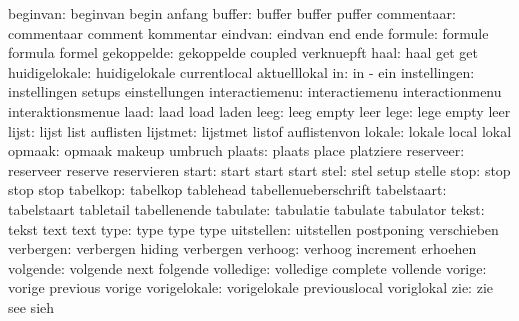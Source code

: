            beginvan:  beginvan             begin               anfang
             buffer:  buffer               buffer              puffer
         commentaar:  commentaar           comment             kommentar
            eindvan:  eindvan              end                 ende
            formule:  formule              formula             formel
         gekoppelde:  gekoppelde           coupled             verknuepft
               haal:  haal                 get                 get
      huidigelokale:  huidigelokale        currentlocal        aktuelllokal
                 in:  in                   -                   ein
       instellingen:  instellingen         setups              einstellungen
     interactiemenu:  interactiemenu       interactionmenu     interaktionsmenue
               laad:  laad                 load                laden
               leeg:  leeg                 empty               leer
               lege:  lege                 empty               leer
              lijst:  lijst                list                auflisten
           lijstmet:  lijstmet             listof              auflistenvon
             lokale:  lokale               local               lokal
             opmaak:  opmaak               makeup              umbruch
             plaats:  plaats               place               platziere
          reserveer:  reserveer            reserve             reservieren
              start:  start                start               start
               stel:  stel                 setup               stelle
               stop:  stop                 stop                stop
           tabelkop:  tabelkop             tablehead           tabellenueberschrift
        tabelstaart:  tabelstaart          tabletail           tabellenende
           tabulate:  tabulatie            tabulate            tabulator
              tekst:  tekst                text                text
               type:  type                 type                type
         uitstellen:  uitstellen           postponing          verschieben
          verbergen:  verbergen            hiding              verbergen
            verhoog:  verhoog              increment           erhoehen
           volgende:  volgende             next                folgende
          volledige:  volledige            complete            vollende
             vorige:  vorige               previous            vorige
       vorigelokale:  vorigelokale         previouslocal       voriglokal
                zie:  zie                  see                 sieh

